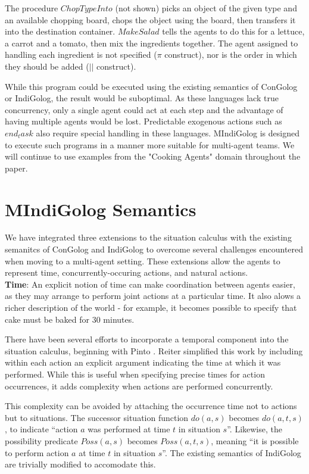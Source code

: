 \documentclass[letterpaper]{article}
\begin{document}
The procedure $ChopTypeInto$ (not shown) picks an object of the given
type and an available chopping board, chops the object using the board,
then transfers it into the destination container. $MakeSalad$ tells
the agents to do this for a lettuce, a carrot and a tomato, then mix
the ingredients together. The agent assigned to handling
each ingredient is not specified ($\pi$ construct), nor is the order in which
they should be added ($||$ construct). 

While this program could be executed using the existing semantics of ConGolog
or IndiGolog, the result would be suboptimal.  As these languages lack true
concurrency, only a single agent could act at each step and the advantage
of having multiple agents would be lost.  Predictable exogenous actions such
as $end_task$ also require special handling in these languages.  MIndiGolog
is designed to execute such programs in a manner more suitable for multi-agent
teams.  We will continue to use examples from the "Cooking Agents" domain
throughout the paper.

\section{MIndiGolog Semantics}

We have integrated three extensions to the situation calculus with the
existing semanitcs of ConGolog and IndiGolog to overcome several
challenges encountered when moving to a multi-agent setting.  These
extensions allow the agents to represent time, concurrently-occuring actions,
and natural actions.
\\

\textbf{Time}: An explicit notion of time can make coordination between agents
easier, as they may arrange to perform joint actions at a particular time.  It
also alows a richer description of the world - for example, it becomes possible
to specify that cake must be baked for 30 minutes.

There have been several efforts to incorporate a temporal component
into the situation calculus, beginning with Pinto \cite{pinto94temporal}.
Reiter \cite{reiter96sc_nat_conc} simplified this work by including
within each action an explicit argument indicating the time at which
it was performed. While this is useful when specifying precise times
for action occurrences, it adds complexity when actions are performed
concurrently.

This complexity can be avoided by attaching the occurrence time not
to actions but to situations. The successor situation function $do(a,s)$
becomes $do(a,t,s)$, to indicate ``action $a$ was performed at
time $t$ in situation $s$''. Likewise, the possibility predicate
$Poss(a,s)$ becomes $Poss(a,t,s)$, meaning ``it is possible to
perform action $a$ at time $t$ in situation $s$''.  The existing semantics
of IndiGolog are trivially modified to accomodate this.
\end{document}
